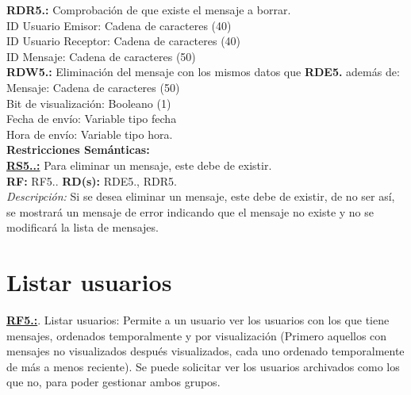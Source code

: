 \textcolor{azul}{\textbf{RDR5.\theRDR:}} Comprobación de que existe el mensaje a borrar. \\
\hspace*{1cm} ID Usuario Emisor: Cadena de caracteres (40) \\
\hspace*{1cm} ID Usuario Receptor: Cadena de caracteres (40) \\
\hspace*{1cm} ID Mensaje: Cadena de caracteres (50) \\[12pt]

\textcolor{azul}{\textbf{RDW5.\theRDW:}} Eliminación del mensaje con los mismos datos que \textcolor{azul}{\textbf{RDE5.\theRDE}} además de:
\hspace*{1cm} Mensaje: Cadena de caracteres (50) \\
\hspace*{1cm} Bit de visualización: Booleano (1) \\
\hspace*{1cm} Fecha de envío: Variable tipo fecha \\
\hspace*{1cm} Hora de envío: Variable tipo hora. \\[12pt]

\setcounter{RS}{1}
\textbf{\textcolor{verde}{Restricciones Semánticas:}} \\[6pt]
\textbf{\textcolor{verde}{\underline{RS5.\theRF.\theRS:}}} Para eliminar un mensaje, este debe de existir. \\
\textbf{RF:} RF5.\theRF. \textbf{RD(s):} RDE5.\theRDE, RDR5.\theRDR \\
\hspace*{1cm} \textit{Descripción:} Si se desea eliminar un mensaje, este debe de existir, de no ser así, se mostrará un mensaje de error indicando que el mensaje no existe y no se modificará la lista de mensajes. \\ [6pt]

\section{Listar usuarios}
\textbf{\textcolor{rojo}{\underline{RF5.\theRF:}}}. Listar usuarios: Permite a un usuario ver los usuarios con los que tiene mensajes, ordenados temporalmente 
y por visualización (Primero aquellos con mensajes no visualizados después visualizados, cada uno ordenado temporalmente de más a menos reciente). Se puede solicitar ver los usuarios archivados como los que no, para poder 
gestionar ambos grupos.\\[6pt]

